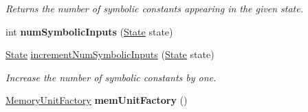 \begin{DoxyCompactItemize}
\begin{DoxyCompactList}\small\item\em Returns the number of symbolic constants appearing in the given state. \end{DoxyCompactList}\item 
\hypertarget{interfaceedu_1_1udel_1_1cis_1_1vsl_1_1civl_1_1state_1_1IF_1_1StateFactory_adae846f055fce4e5a5ad400c92d2ef6d}{}int {\bfseries num\+Symbolic\+Inputs} (\hyperlink{interfaceedu_1_1udel_1_1cis_1_1vsl_1_1civl_1_1state_1_1IF_1_1State}{State} state)\label{interfaceedu_1_1udel_1_1cis_1_1vsl_1_1civl_1_1state_1_1IF_1_1StateFactory_adae846f055fce4e5a5ad400c92d2ef6d}

\item 
\hyperlink{interfaceedu_1_1udel_1_1cis_1_1vsl_1_1civl_1_1state_1_1IF_1_1State}{State} \hyperlink{interfaceedu_1_1udel_1_1cis_1_1vsl_1_1civl_1_1state_1_1IF_1_1StateFactory_afb5218196825ebba4a22fb05335a008c}{increment\+Num\+Symbolic\+Inputs} (\hyperlink{interfaceedu_1_1udel_1_1cis_1_1vsl_1_1civl_1_1state_1_1IF_1_1State}{State} state)
\begin{DoxyCompactList}\small\item\em Increase the number of symbolic constants by one. \end{DoxyCompactList}\item 
\hypertarget{interfaceedu_1_1udel_1_1cis_1_1vsl_1_1civl_1_1state_1_1IF_1_1StateFactory_aadbb2c92c0b77f2549d36fd17469b42b}{}\hyperlink{interfaceedu_1_1udel_1_1cis_1_1vsl_1_1civl_1_1state_1_1IF_1_1MemoryUnitFactory}{Memory\+Unit\+Factory} {\bfseries mem\+Unit\+Factory} ()\label{interfaceedu_1_1udel_1_1cis_1_1vsl_1_1civl_1_1state_1_1IF_1_1StateFactory_aadbb2c92c0b77f2549d36fd17469b42b}


\end{DoxyCompactItemize}
